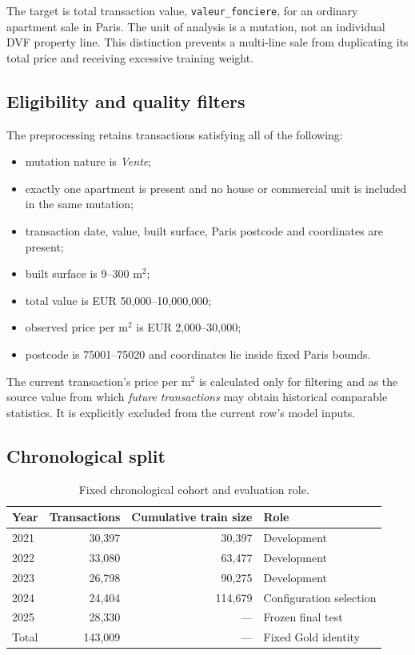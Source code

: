 \documentclass[11pt,a4paper]{article}
\begin{document}
The target is total transaction value, \texttt{valeur\_fonciere}, for an
ordinary apartment sale in Paris. The unit of analysis is a mutation, not an
individual DVF property line. This distinction prevents a multi-line sale from
duplicating its total price and receiving excessive training weight.

\subsection{Eligibility and quality filters}

The preprocessing retains transactions satisfying all of the following:
\begin{itemize}[leftmargin=1.5em]
  \item mutation nature is \emph{Vente};
  \item exactly one apartment is present and no house or commercial unit is
  included in the same mutation;
  \item transaction date, value, built surface, Paris postcode and coordinates
  are present;
  \item built surface is 9--300 m$^2$;
  \item total value is EUR 50,000--10,000,000;
  \item observed price per m$^2$ is EUR 2,000--30,000;
  \item postcode is 75001--75020 and coordinates lie inside fixed Paris bounds.
\end{itemize}

The current transaction's price per m$^2$ is calculated only for filtering and
as the source value from which \emph{future transactions} may obtain historical
comparable statistics. It is explicitly excluded from the current row's model
inputs.

\subsection{Chronological split}

\begin{table}[H]
\centering
\caption{Fixed chronological cohort and evaluation role.}
\label{tab:splits}
\begin{tabular}{lrrl}
\toprule
Year & Transactions & Cumulative train size & Role \\
\midrule
2021 & 30,397 & 30,397 & Development \\
2022 & 33,080 & 63,477 & Development \\
2023 & 26,798 & 90,275 & Development \\
2024 & 24,404 & 114,679 & Configuration selection \\
2025 & 28,330 & --- & Frozen final test \\
\midrule
Total & 143,009 & --- & Fixed Gold identity \\
\bottomrule
\end{tabular}
\end{table}
\end{document}
